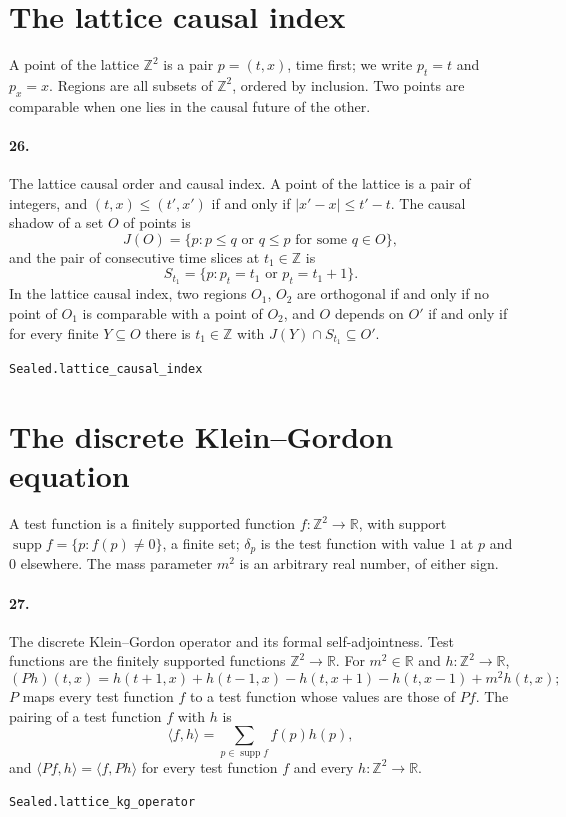 \documentclass[11pt]{article}
\begin{document}
\section*{The lattice causal index}
A point of the lattice $\mathbb Z^2$ is a pair $p = (t, x)$, time first; we write $p_t = t$ and $p_x = x$. Regions are all subsets of $\mathbb Z^2$, ordered by inclusion. Two points are comparable when one lies in the causal future of the other.

\paragraph{26.} The lattice causal order and causal index. A point of the lattice is a pair of integers, and $(t, x) \le (t', x')$ if and only if $|x' - x| \le t' - t$. The causal shadow of a set $O$ of points is \[J(O) = \{p : p \le q \text{ or } q \le p \text{ for some } q \in O\},\] and the pair of consecutive time slices at $t_1 \in \mathbb Z$ is \[S_{t_1} = \{p : p_t = t_1 \text{ or } p_t = t_1 + 1\}.\] In the lattice causal index, two regions $O_1$, $O_2$ are orthogonal if and only if no point of $O_1$ is comparable with a point of $O_2$, and $O$ depends on $O'$ if and only if for every finite $Y \subseteq O$ there is $t_1 \in \mathbb Z$ with $J(Y) \cap S_{t_1} \subseteq O'$.\par{\footnotesize\texttt{Sealed.lattice\_causal\_index}}

\section*{The discrete Klein–Gordon equation}
A test function is a finitely supported function $f : \mathbb Z^2 \to \mathbb R$, with support $\operatorname{supp} f = \{p : f(p) \ne 0\}$, a finite set; $\delta_p$ is the test function with value $1$ at $p$ and $0$ elsewhere. The mass parameter $m^2$ is an arbitrary real number, of either sign.

\paragraph{27.} The discrete Klein–Gordon operator and its formal self-adjointness. Test functions are the finitely supported functions $\mathbb Z^2 \to \mathbb R$. For $m^2 \in \mathbb R$ and $h : \mathbb Z^2 \to \mathbb R$, \[(Ph)(t, x) = h(t+1, x) + h(t-1, x) - h(t, x+1) - h(t, x-1) + m^2 h(t, x);\] $P$ maps every test function $f$ to a test function whose values are those of $P f$. The pairing of a test function $f$ with $h$ is \[\langle f, h \rangle = \sum_{p \in \operatorname{supp} f} f(p) h(p),\] and $\langle P f, h \rangle = \langle f, P h \rangle$ for every test function $f$ and every $h : \mathbb Z^2 \to \mathbb R$.\par{\footnotesize\texttt{Sealed.lattice\_kg\_operator}}
\end{document}
